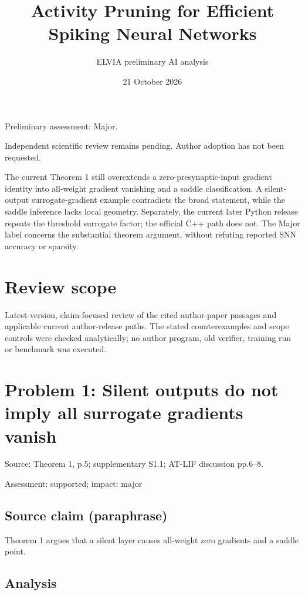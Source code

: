 \documentclass[11pt]{article}
\begin{document}
\title{Activity Pruning for Efficient Spiking Neural Networks}

\author{ELVIA preliminary AI analysis}\date{21 October 2026}\maketitle

Preliminary assessment: Major.\par

Independent scientific review remains pending. Author adoption has not been requested.

The current Theorem 1 still overextends a zero-presynaptic-input gradient identity into all-weight gradient vanishing and a saddle classification. A silent-output surrogate-gradient example contradicts the broad statement, while the saddle inference lacks local geometry. Separately, the current later Python release repeats the threshold surrogate factor; the official C++ path does not. The Major label concerns the substantial theorem argument, without refuting reported SNN accuracy or sparsity.

\section*{Review scope}

Latest-version, claim-focused review of the cited author-paper passages and applicable current author-release paths. The stated counterexamples and scope controls were checked analytically; no author program, old verifier, training run or benchmark was executed.

\section*{Problem 1: Silent outputs do not imply all surrogate gradients vanish}

Source: Theorem 1, p.5; supplementary S1.1; AT-LIF discussion pp.6–8.

Assessment: supported; impact: major

\subsection*{Source claim (paraphrase)}

Theorem 1 argues that a silent layer causes all-weight zero gradients and a saddle point.

\subsection*{Analysis}
\end{document}
